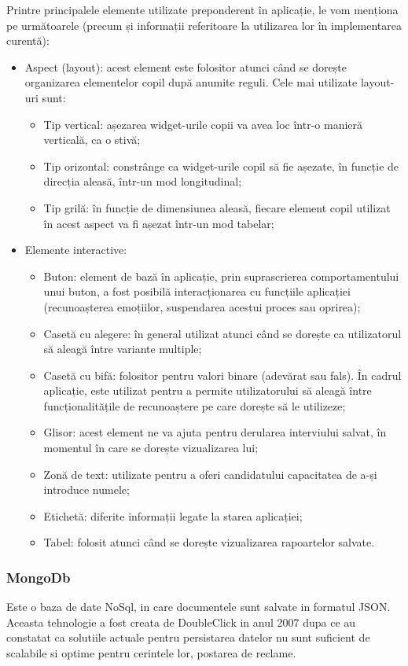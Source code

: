 \documentclass[a4paper, 12pt]{report}
\begin{document}
	Printre principalele elemente utilizate preponderent în aplicație, le vom menționa pe următoarele (precum și informații referitoare la utilizarea lor în implementarea curentă):
	\begin{itemize}
		\item Aspect (layout): acest element este folositor atunci când se dorește organizarea elementelor copil după anumite reguli. Cele mai utilizate layout-uri sunt:
		\begin{itemize}
			\item Tip vertical: așezarea widget-urile copii va avea loc într-o manieră verticală, ca o stivă;
			\item Tip orizontal: constrânge ca widget-urile copil să fie așezate, în funcție de direcția aleasă, într-un mod longitudinal;
			\item Tip grilă: în funcție de dimensiunea aleasă, fiecare element copil utilizat în acest aspect va fi așezat într-un mod tabelar;
		\end{itemize}
		\item Elemente interactive:
		\begin{itemize}
			\item Buton: element de bază în aplicație, prin suprascrierea comportamentului unui buton, a fost posibilă interacționarea cu funcțiile aplicației (recunoașterea emoțiilor, suspendarea acestui proces sau oprirea);
			\item Casetă cu alegere: în general utilizat atunci când se dorește ca utilizatorul să aleagă între variante multiple;
			\item Casetă cu bifă: folositor pentru valori binare (adevărat sau fals). În cadrul aplicație, este utilizat pentru a permite utilizatorului să aleagă între funcționalitățile de recunoaștere pe care dorește să le utilizeze;
			\item Glisor: acest element ne va ajuta pentru derularea interviului salvat, în momentul în care se dorește vizualizarea lui;
			\item Zonă de text: utilizate pentru a oferi candidatului capacitatea de a-și introduce numele;
			\item Etichetă: diferite informații legate la starea aplicației;
			\item Tabel: folosit atunci când se dorește vizualizarea rapoartelor salvate.
		\end{itemize}
	\end{itemize}
	
	\subsubsection{MongoDb}
	Este o baza de date NoSql, in care documentele sunt salvate in formatul JSON. Aceasta tehnologie a fost creata de DoubleClick in anul 2007 dupa ce au constatat ca solutiile actuale pentru persistarea datelor nu sunt suficient de scalabile si optime pentru cerintele lor, postarea de reclame. 
	
\end{document}

